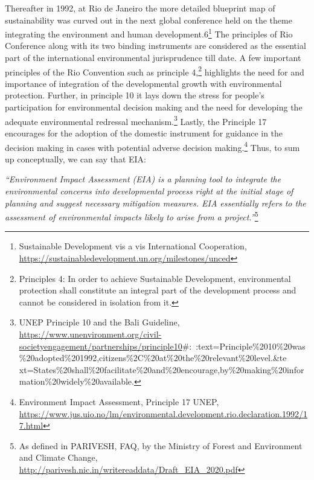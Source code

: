 \begin{multicols}{2}
\noi
Thereafter in 1992, at Rio de Janeiro the more detailed blueprint map of sustainability was
curved out in the next global conference held on the theme integrating the environment and
human development.6\footnote{Sustainable Development vis a vis International Cooperation, \url{https://sustainabledevelopment.un.org/milestones/unced}}
 The principles of Rio Conference along with its two binding
instruments are considered as the essential part of the international environmental
jurisprudence till date. A few important principles of the Rio Convention such as principle 4,\footnote{Principles 4: In order to achieve Sustainable Development, environmental protection shall constitute an integral part of the development process and cannot be considered in isolation from it.}
highlights the need for and importance of integration of the developmental growth with environmental protection. Further, in principle 10 it lays down the stress for people’s
participation for environmental decision making and the need for developing the adequate
environmental redressal mechanism.\footnote{UNEP Principle 10 and the Bali Guideline, \url{https://www.unenvironment.org/civil-societyengagement/partnerships/principle10}\#:~:text=Principle\%2010\%20was\%20adopted\%201992,citizens\%2C\%20at\%20the\%20relevant\%20level.\&te xt=States\%20shall\%20facilitate\%20and\%20encourage,by\%20making\%20information\%20widely\%20available.}
 Lastly, the Principle 17 encourages for the adoption of
the domestic instrument for guidance in the decision making in cases with potential adverse
decision making.\footnote{Environment Impact Assessment, Principle 17 UNEP,
\url{https://www.jus.uio.no/lm/environmental.development.rio.declaration.1992/17.html}}
 Thus, to sum up conceptually, we can say that EIA:

\noi
\textit{“Environment Impact Assessment (EIA) is a planning tool to integrate the environmental
concerns into developmental process right at the initial stage of planning and suggest
necessary mitigation measures. EIA essentially refers to the assessment of environmental
impacts likely to arise from a project.”}\footnote{As defined in PARIVESH, FAQ, by the Ministry of Forest and Environment and Climate Change,
\url{http://parivesh.nic.in/writereaddata/Draft_EIA_2020.pdf}}


\end{multicols}

